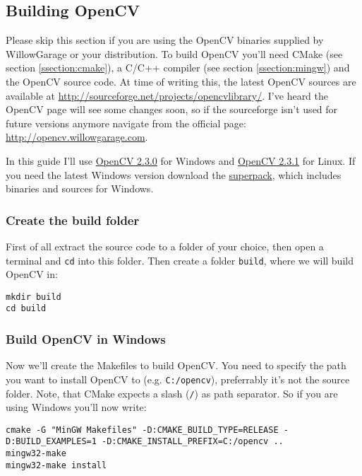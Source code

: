 \subsection{Building OpenCV}

Please skip this section if you are using the OpenCV binaries supplied by WillowGarage or your distribution. To build OpenCV you'll need CMake (see section \ref{ssection:cmake}), a C/C++ compiler (see section \ref{ssection:mingw}) and the OpenCV source code. At time of writing this, the latest OpenCV sources are available at \url{http://sourceforge.net/projects/opencvlibrary/}. I've heard the OpenCV page will see some changes soon, so if the sourceforge isn't used for future versions anymore navigate from the official page: \url{http://opencv.willowgarage.com}.

In this guide I'll use \href{http://sourceforge.net/projects/opencvlibrary/files/opencv-win}{OpenCV 2.3.0} for Windows and \href{http://sourceforge.net/projects/opencvlibrary/files/opencv-unix}{OpenCV 2.3.1} for Linux. If you need the latest Windows version download the \href{http://sourceforge.net/projects/opencvlibrary/files/opencv-win/}{superpack}, which includes binaries and sources for Windows.

\subsubsection*{Create the build folder}

First of all extract the source code to a folder of your choice, then open a terminal and \lstinline|cd| into this folder. Then create a folder \lstinline|build|, where we will build OpenCV in:

\begin{lstlisting}
mkdir build
cd build
\end{lstlisting}

\subsubsection*{Build OpenCV in Windows}

Now we'll create the Makefiles to build OpenCV. You need to specify the path you want to install OpenCV to (e.g. \lstinline|C:/opencv|), preferrably it's not the source folder. Note, that CMake expects a slash (\lstinline|/|) as path separator. So if you are using Windows you'll now write:

\begin{lstlisting}
cmake -G "MinGW Makefiles" -D:CMAKE_BUILD_TYPE=RELEASE -D:BUILD_EXAMPLES=1 -D:CMAKE_INSTALL_PREFIX=C:/opencv ..
mingw32-make 
mingw32-make install
\end{lstlisting}

